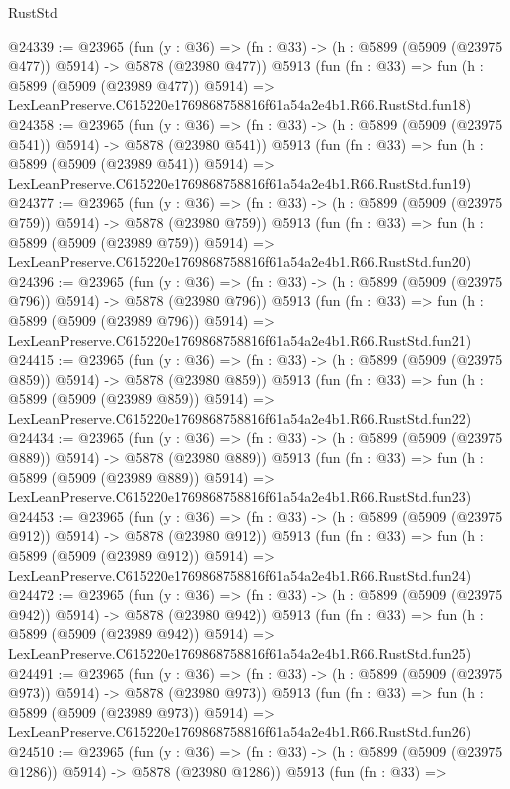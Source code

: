 \begin{lexlean}{RustStd}
\begin{coremodule}
{{@24339 := @23965
    (fun (y : @36) => (fn : @33) -> (h : @5899 (@5909 (@23975 @477)) @5914) -> @5878 (@23980 @477))
    @5913
    (fun (fn : @33) =>
    fun (h : @5899 (@5909 (@23989 @477)) @5914) =>
    LexLeanPreserve.C615220e1769868758816f61a54a2e4b1.R66.RustStd.fun18)
@24358 := @23965
    (fun (y : @36) => (fn : @33) -> (h : @5899 (@5909 (@23975 @541)) @5914) -> @5878 (@23980 @541))
    @5913
    (fun (fn : @33) =>
    fun (h : @5899 (@5909 (@23989 @541)) @5914) =>
    LexLeanPreserve.C615220e1769868758816f61a54a2e4b1.R66.RustStd.fun19)
@24377 := @23965
    (fun (y : @36) => (fn : @33) -> (h : @5899 (@5909 (@23975 @759)) @5914) -> @5878 (@23980 @759))
    @5913
    (fun (fn : @33) =>
    fun (h : @5899 (@5909 (@23989 @759)) @5914) =>
    LexLeanPreserve.C615220e1769868758816f61a54a2e4b1.R66.RustStd.fun20)
@24396 := @23965
    (fun (y : @36) => (fn : @33) -> (h : @5899 (@5909 (@23975 @796)) @5914) -> @5878 (@23980 @796))
    @5913
    (fun (fn : @33) =>
    fun (h : @5899 (@5909 (@23989 @796)) @5914) =>
    LexLeanPreserve.C615220e1769868758816f61a54a2e4b1.R66.RustStd.fun21)
@24415 := @23965
    (fun (y : @36) => (fn : @33) -> (h : @5899 (@5909 (@23975 @859)) @5914) -> @5878 (@23980 @859))
    @5913
    (fun (fn : @33) =>
    fun (h : @5899 (@5909 (@23989 @859)) @5914) =>
    LexLeanPreserve.C615220e1769868758816f61a54a2e4b1.R66.RustStd.fun22)
@24434 := @23965
    (fun (y : @36) => (fn : @33) -> (h : @5899 (@5909 (@23975 @889)) @5914) -> @5878 (@23980 @889))
    @5913
    (fun (fn : @33) =>
    fun (h : @5899 (@5909 (@23989 @889)) @5914) =>
    LexLeanPreserve.C615220e1769868758816f61a54a2e4b1.R66.RustStd.fun23)
@24453 := @23965
    (fun (y : @36) => (fn : @33) -> (h : @5899 (@5909 (@23975 @912)) @5914) -> @5878 (@23980 @912))
    @5913
    (fun (fn : @33) =>
    fun (h : @5899 (@5909 (@23989 @912)) @5914) =>
    LexLeanPreserve.C615220e1769868758816f61a54a2e4b1.R66.RustStd.fun24)
@24472 := @23965
    (fun (y : @36) => (fn : @33) -> (h : @5899 (@5909 (@23975 @942)) @5914) -> @5878 (@23980 @942))
    @5913
    (fun (fn : @33) =>
    fun (h : @5899 (@5909 (@23989 @942)) @5914) =>
    LexLeanPreserve.C615220e1769868758816f61a54a2e4b1.R66.RustStd.fun25)
@24491 := @23965
    (fun (y : @36) => (fn : @33) -> (h : @5899 (@5909 (@23975 @973)) @5914) -> @5878 (@23980 @973))
    @5913
    (fun (fn : @33) =>
    fun (h : @5899 (@5909 (@23989 @973)) @5914) =>
    LexLeanPreserve.C615220e1769868758816f61a54a2e4b1.R66.RustStd.fun26)
@24510 := @23965
    (fun (y : @36) =>
    (fn : @33) -> (h : @5899 (@5909 (@23975 @1286)) @5914) -> @5878 (@23980 @1286))
    @5913
    (fun (fn : @33) =>
}}
\end{coremodule}
\end{lexlean}
